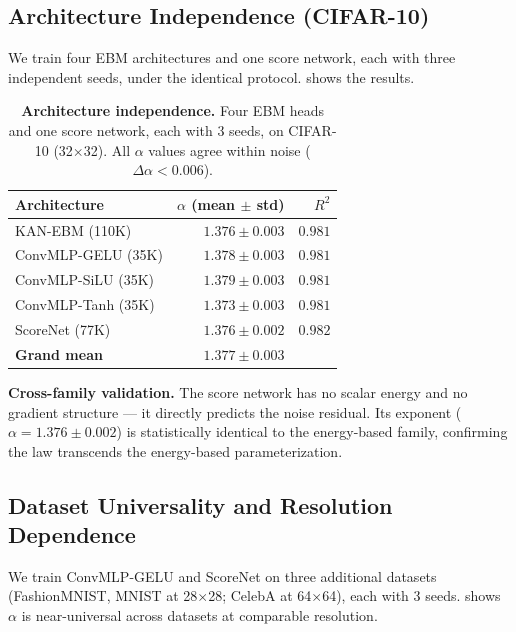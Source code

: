 \documentclass[letterpaper]{article}
\begin{document}
\subsection{Architecture Independence (CIFAR-10)}
\label{sec:arch}

We train four EBM architectures and one score network, each with
three independent seeds, under the identical protocol.
 shows the results.

\begin{table}[t]
\centering\small
\begin{tabular}{lrr}
\toprule
Architecture & $\alpha$ (mean $\pm$ std) & $R^2$ \\
\midrule
KAN-EBM (110K)     & $1.376 \pm 0.003$ & $0.981$ \\
ConvMLP-GELU (35K) & $1.378 \pm 0.003$ & $0.981$ \\
ConvMLP-SiLU (35K) & $1.379 \pm 0.003$ & $0.981$ \\
ConvMLP-Tanh (35K) & $1.373 \pm 0.003$ & $0.981$ \\
\midrule
ScoreNet (77K)     & $1.376 \pm 0.002$ & $0.982$ \\
\midrule
\textbf{Grand mean} & $\bm{1.377 \pm 0.003}$ & \\
\bottomrule
\end{tabular}
\caption{\textbf{Architecture independence.} Four EBM heads and one
score network, each with 3 seeds, on CIFAR-10 (32$\times$32).
All $\alpha$ values agree within noise ($\Delta\alpha < 0.006$).}
\label{tab:tier0}
\end{table}

\textbf{Cross-family validation.}
The score network has no scalar energy and no gradient structure ---
it directly predicts the noise residual.
Its exponent ($\alpha = 1.376 \pm 0.002$) is statistically
identical to the energy-based family, confirming the law transcends
the energy-based parameterization.

\subsection{Dataset Universality and Resolution Dependence}
\label{sec:datasets}

We train ConvMLP-GELU and ScoreNet on three additional datasets
(FashionMNIST, MNIST at 28$\times$28; CelebA at 64$\times$64),
each with 3 seeds.
 shows $\alpha$ is near-universal across
datasets at comparable resolution.
\end{document}
